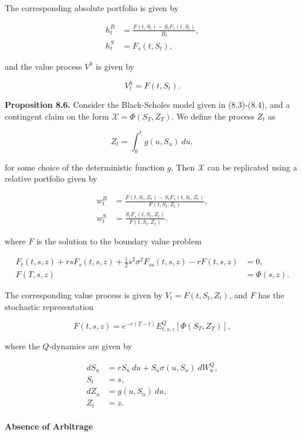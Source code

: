 \documentclass[
]{article}
\begin{document}
The corresponding absolute portfolio is given by

\begin{align*}
h_t^B&=\frac{F(t,S_t)-S_tF_s(t,S_t)}{B_t},\\
h_t^S&=F_s(t,S_t),
\end{align*}

and the value process \(V^h\) is given by

\[
V^h_t=F(t,S_t).
\]

\textbf{Proposition 8.6.} Consider the Black-Scholes model given in
(8.3)-(8.4), and a contingent claim on the form
\(\mathcal{X}=\Phi(S_T,Z_T)\). We define the process \(Z_t\) as

\[
Z_t=\int_0^tg(u,S_u)\ du,
\]

for some choice of the deterministic function \(g\). Then
\(\mathcal{X}\) can be replicated using a relative portfolio given by

\begin{align*}
w_t^B&=\frac{F(t,S_t,Z_t)-S_tF_s(t,S_t,Z_t)}{F(t,S_t,Z_t)},\\
w_t^S&=\frac{S_tF_s(t,S_t,Z_t)}{F(t,S_t,Z_t)}.
\end{align*}

where \(F\) is the solution to the boundary value problem

\begin{align*}
F_t(t,s,z)+rsF_s(t,s,z)+\frac{1}{2}s^2\sigma^2F_{ss}(t,s,z)-rF(t,s,z)&=0,\\
F(T,s,z)&=\Phi(s,z).
\end{align*}

The corresponding value process is given by \(V_t=F(t,S_t,Z_t)\), and
\(F\) has the stochastic representation

\[
F(t,s,z)=e^{-r(T-t)}E^Q_{t,s,z}[\Phi(S_T,Z_T)],
\]

where the \(Q\)-dynamics are given by

\begin{align*}
dS_u&=rS_u\ du + S_u\sigma(u,S_u)\ dW^Q_u,\\
S_t&=s,\\
dZ_u&=g(u,S_u)\ du,\\
Z_t&=z.
\end{align*}

\hypertarget{absence-of-arbitrage-1}{%
\paragraph{Absence of Arbitrage}\label{absence-of-arbitrage-1}}
\end{document}
